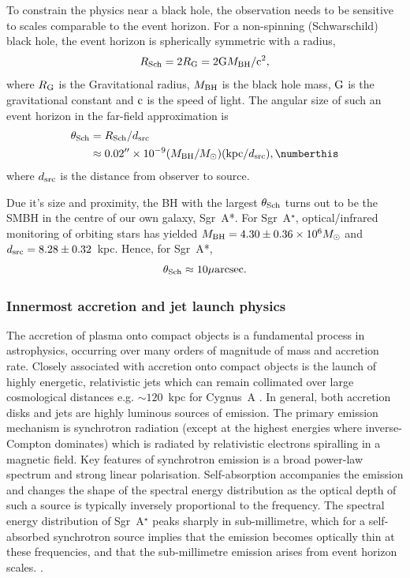 To constrain the physics near a black hole, the observation needs to be sensitive to scales comparable to the event horizon. For a non-spinning (Schwarschild) black hole, the event horizon is spherically symmetric with a radius, 
\begin{equation}
R_{\rm Sch} = 2 R_{\rm G} = 2 {\rm G} M_{\rm BH} /{\rm c}^2,
\end{equation}
where $R_{\rm G}$ is the Gravitational radius, $M_{\rm BH}$ is the black hole mass, ${\rm G}$ is the gravitational constant and ${\rm c}$ is the speed of light. The angular size of such an event horizon in the far-field approximation is
\begin{align*}
\theta_{\rm Sch} &= R_{\rm Sch} / d_{\rm src}\\
&\approx 0.02^{\prime \prime} \times 10^{-9} (M_{\rm BH}/M_\odot)({\rm kpc}/d_{\rm src}),  \numberthis 
\end{align*}
where $d_{\rm src}$ is the distance from observer to source. 

Due it's size and proximity, the BH with the largest $\theta_{\rm Sch}$ turns out to be the SMBH in the centre of our own galaxy, Sgr~A*. For Sgr~A$^\star$, optical/infrared monitoring of orbiting stars \citep{Gillessen_2009} has yielded ${M_{\rm BH} = 4.30 \pm 0.36 \times 10^{6} M_\odot}$ and ${d_{\rm src}= 8.28 \pm 0.32}$~kpc. Hence, for Sgr~A*,  $$\theta_{\rm Sch} \approx 10 \mu{\rm arcsec}.$$

\subsubsection{Innermost accretion and jet launch physics}

The accretion of plasma onto compact objects is a fundamental process in astrophysics, occurring over many orders of magnitude of mass and accretion rate. Closely associated with accretion onto compact objects is the launch of highly energetic, relativistic jets which can remain collimated over large cosmological distances e.g. $\sim 120$~kpc for Cygnus~A \citep{Perley_1984}. In general, both accretion disks and jets are highly luminous sources of emission. The primary emission mechanism is synchrotron radiation (except at the highest energies where inverse-Compton dominates) which is radiated by relativistic electrons spiralling in a magnetic field. Key features of synchrotron emission is a broad power-law spectrum and strong linear polarisation. Self-absorption accompanies the emission and changes the shape of the spectral energy distribution as the optical depth of such a source is typically inversely proportional to the frequency. 
The spectral energy distribution of Sgr~A$^\star$ peaks sharply in sub-millimetre, which for a self-absorbed synchrotron source implies that the emission becomes optically thin at these frequencies, and that the sub-millimetre emission arises from event horizon scales. \citep{Serabyn_1997,Falcke_1998}. 


